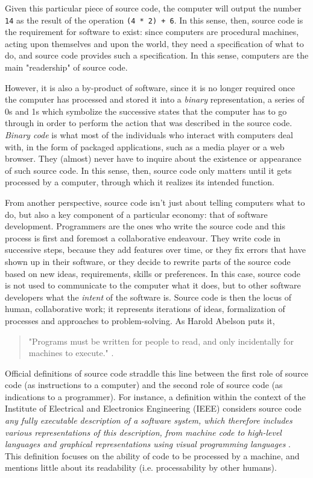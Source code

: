 Given this particular piece of source code, the computer will output the number \lstinline{14} as the result of the operation \lstinline{(4 * 2) + 6}. In this sense, then, source code is the requirement for software to exist: since computers are procedural machines, acting upon themselves and upon the world, they need a specification of what to do, and source code provides such a specification. In this sense, computers are the main "readership" of source code.

However, it is  also a by-product of software, since it is no longer required once the computer has processed and stored it into a \emph{binary} representation, a series of 0s and 1s which symbolize the successive states that the computer has to go through in order to perform the action that was described in the source code. \emph{Binary code} is what most of the individuals who interact with computers deal with, in the form of packaged applications, such as a media player or a web browser. They (almost) never have to inquire about the existence or appearance of such source code. In this sense, then, source code only matters until it gets processed by a computer, through which it realizes its intended function.

From another perspective, source code isn't just about telling computers what to do, but also a key component of a particular economy: that of software development. Programmers are the ones who write the source code and this process is first and foremost a collaborative endeavour. They write code in successive steps, because they add features over time, or they fix errors that have shown up in their software, or they decide to rewrite parts of the source code based on new ideas, requirements, skills or preferences. In this case, source code is not used to communicate to the computer what it does, but to other software developers what the \emph{intent} of the software is. Source code is then the locus of human, collaborative work; it represents iterations of ideas, formalization of processes and approaches to problem-solving. As Harold Abelson puts it,

\begin{quote}
    "Programs must be written for people to read, and only incidentally for machines to execute." \citep{abelson_structure_1979}.
\end{quote}

Official definitions of source code straddle this line between the first role of source code (as instructions to a computer) and the second role of source code (as indications to a programmer). For instance, a definition within the context of the Institute of Electrical and Electronics Engineering (IEEE) considers source code \emph{any fully executable description of a software system, which therefore includes various representations of this description, from machine code to high-level languages and graphical representations using visual programming languages} \citep{harman_why_2010}. This definition focuses on the ability of code to be processed by a machine, and mentions little about its readability (i.e. processability by other humans).

